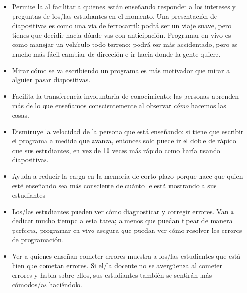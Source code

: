 \begin{itemize}

\item
  Permite la 
  al facilitar a quienes están enseñando responder a los intereses y preguntas de los/las estudiantes en el momento.
  Una presentación de diapositivas es como una vía de ferrocarril:
  podrá ser un viaje suave,
  pero tienes que decidir hacia dónde vas con anticipación.
  Programar en vivo es como manejar un vehículo todo terreno:
  podrá ser más accidentado,
  pero es mucho más fácil cambiar de dirección e ir hacia donde la gente quiere.

\item
  Mirar cómo se va escribiendo un programa es más motivador
  que mirar a alguien pasar diapositivas.

\item
  Facilita la transferencia involuntaria de conocimiento:
  las personas aprenden más de lo que enseñamos conscientemente
  al observar \emph{cómo} hacemos las cosas.

\item
  Disminuye la velocidad de la persona que está enseñando:
  si tiene que escribir el programa a medida que avanza,
  entonces solo puede ir el doble de rápido que sus estudiantes,
  en vez de 10 veces más rápido como haría usando diapositivas.

\item
  Ayuda a reducir la carga en la memoria de corto plazo
  porque hace que quien esté enseñando sea más consciente de cuánto
  le está mostrando a sus estudiantes.

\item
  Los/las estudiantes pueden ver cómo diagnosticar y corregir errores.
  Van a dedicar mucho tiempo a esta tarea;
  a menos que puedan tipear de manera perfecta,
  programar en vivo asegura que puedan ver cómo resolver los errores de programación.

\item
  Ver a quienes enseñan cometer errores muestra a los/las estudiantes que está bien que cometan errores.
  Si el/la docente no se avergüenza al cometer errores y habla sobre ellos,
  sus estudiantes también se sentirán más cómodos/as haciéndolo.

\end{itemize}

